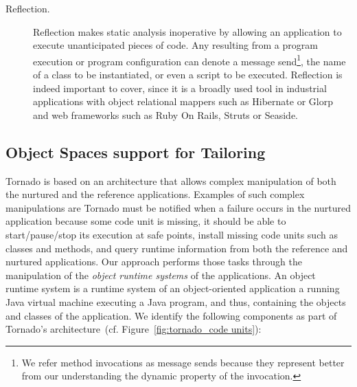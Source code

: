 \begin{description}
\item[Reflection.] Reflection makes static analysis inoperative by allowing an application to execute unanticipated pieces of code. 
Any  resulting from a program execution or program configuration can denote a message send\footnote{We refer method invocations as message sends because they represent better from our understanding the dynamic property of the invocation.}, the name of a class to be instantiated, or even a script to be executed. Reflection is indeed important to cover, since it is a broadly used tool in industrial applications with object relational mappers such as Hibernate or Glorp and web frameworks such as Ruby On Rails, Struts or Seaside.

\end{description}


\subsection{Object Spaces support for Tailoring}


Tornado is based on an architecture that allows complex manipulation of both the nurtured and the reference applications. Examples of such complex manipulations are \eg Tornado must be notified when a failure occurs in the nurtured application because some code unit is missing, it should be able to start/pause/stop its execution at safe points, install missing code units such as classes and methods, and query runtime information from both the reference and nurtured applications. Our approach performs those tasks through the manipulation of the \emph{object runtime systems} of the applications. An object runtime system is a runtime system of an object-oriented application \eg a running Java virtual machine executing a Java program, and thus, containing the objects and classes of the application. We identify the following components as part of Tornado's architecture~(cf. Figure~\ref{fig:tornado_code units}):

